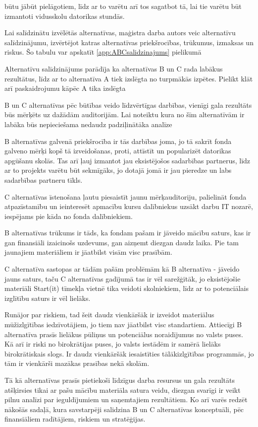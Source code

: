 būtu jābūt pielāgotiem, līdz ar to varētu arī tos sagatbot tā, lai tie varētu būt izmantoti vidusskolu datorikas
stundās.
\par
Lai salīdzinātu izvēlētās alternatīvas, maģistra darba autors veic alternatīvu salīdzinājumu,
izvērtējot katras alternatīvas priekšrocības, trūkumus, izmaksas un riskus. Šo tabulu var apskatīt \ref{app:ABCsalidzinajums} pielikumā
\par 
Alternatīvu salīdzinājums parādīja ka alternatīvas B un C rada labākus rezultātus, līdz ar to alternatīva A tiek
izslēgta no turpmākās izpētes.
Pielikt klāt arī paskaidrojumu kāpēc A tika izslēgta
\par
B un C alternatīvas pēc būtības veido līdzvērtīgas darbības, vienīgi gala rezultāts būs mērķēts uz dažādām
auditorijām. Lai noteiktu kura no šīm alternatīvām ir labāka būs nepieciešama nedaudz padziļinātāka analīze
\par
B alternatīvas galvenā priekšrocība ir tās darbības joma, jo tā sakrīt fonda galveno mērķi kopš tā izveidošanas, proti,
attīstīt un popularizēt datorikas apgūšanu skolās. Tas arī ļauj izmantot jau eksistējošos sadarbības partnerus,
līdz ar to projekts varētu būt sekmīgāks, jo dotajā jomā ir jau pieredze un labs sadarbības partneru tīkls.
\par
C alternatīvas īstenošana ļautu piesaistīt jaunu mērķauditoriju, palielināt fonda atpazīstamību un ieinteresēt
apmacību kursu dalībniekus uzsākt darbu IT nozarē, iespējams pie kāda no fonda dalībniekiem.
\par
B alternatīvas trūkums ir tāds, ka fondam pašam ir jāveido mācību saturs, kas ir gan finansiāli izaicinošs 
uzdevums, gan aizņemt diezgan daudz laika. Pie tam jaunajiem materiāliem ir jāatbilst visām \acrshort{visc}
prasībām.
\par
C alternatīva sastopas ar tādām pašām problēmām kā B alternatīva - jāveido jauns saturs, taču C alternatīvas gadījumā
tas ir vēl sarežģītāk, jo eksistējošie materiāli Start(it) tīmekļa vietnē tika veidoti skolniekiem, līdz ar to
potenciālais izglītību saturs ir vēl lielāks.
\par
Runājor par riskiem, tad šeit daudz vienkāršāk ir izveidot materiālus mūžizlgītības iedzīvotājiem, jo tiem
nav jāatbilst \acrshort{visc} standartiem. Attiecīgi B alternatīva prasīs lielākus pūliņus un potenciālus noraidījumus no
valsts puses. Kā arī ir riski no birokrātijas puses, jo valsts iestādēm ir samērā lielāks birokrātiskais slogs. Ir daudz
vienkāršāk iesaistīties tālākizlgītības programmās, jo tām ir vienkārši mazākas prasības nekā skolām.
\par
Tā kā alternatīvas prasīs pietiekoši līdzīgus darba resursus un gala rezultāts atšķirsies tikai ar pašu mācību materiāla
satura veidu, diezgan svarīgi ir veikt pilnu analīzi par ieguldījumiem un saņemtajiem rezultātiem. Ko arī varēs redzēt
nākošās sadaļā, kura savstarpēji salidzina B un C alternatīvas konceptuāli, pēc finansiāliem radītājiem, riskiem un stratēģijas.
